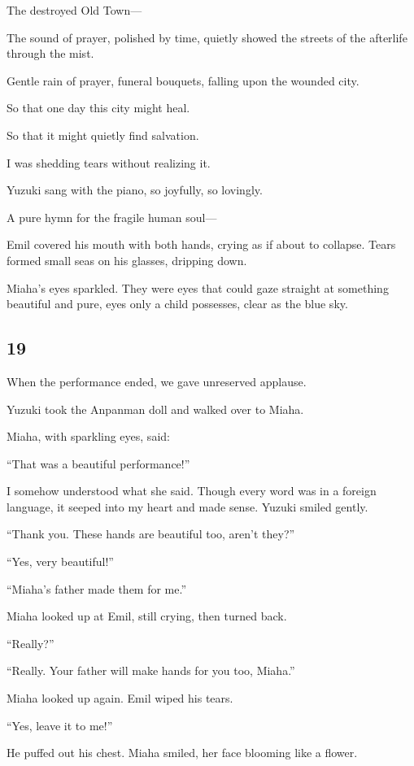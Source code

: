 \documentclass[
    a4paper,
    12pt,
    twoside,
    openany,
    UTF8,
    fontset=windows
]{ctexbook}
\begin{document}
The destroyed Old Town---

The sound of prayer, polished by time, quietly showed the streets of the afterlife through the mist.

Gentle rain of prayer, funeral bouquets, falling upon the wounded city.

So that one day this city might heal.

So that it might quietly find salvation.

I was shedding tears without realizing it.

Yuzuki sang with the piano, so joyfully, so lovingly.

A pure hymn for the fragile human soul---

Emil covered his mouth with both hands, crying as if about to collapse. Tears formed small seas on his glasses, dripping down.

Miaha's eyes sparkled. They were eyes that could gaze straight at something beautiful and pure, eyes only a child possesses, clear as the blue sky.


\subsection*{19}

When the performance ended, we gave unreserved applause.

Yuzuki took the Anpanman doll and walked over to Miaha.

Miaha, with sparkling eyes, said:

``That was a beautiful performance!''

I somehow understood what she said. Though every word was in a foreign language, it seeped into my heart and made sense. Yuzuki smiled gently.

``Thank you. These hands are beautiful too, aren't they?''

``Yes, very beautiful!''

``Miaha's father made them for me.''

Miaha looked up at Emil, still crying, then turned back.

``Really?''

``Really. Your father will make hands for you too, Miaha.''

Miaha looked up again. Emil wiped his tears.

``Yes, leave it to me!''

He puffed out his chest. Miaha smiled, her face blooming like a flower.
\end{document}
